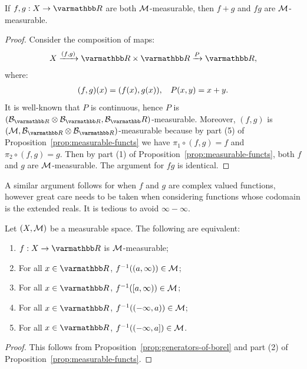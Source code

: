 \begin{proposition}\label{prop:sums-prods-of-measurable-functions}
    If $f,g:X \rightarrow \bfR$ are both $\cM$-measurable, then $f+g$ and $fg$ are $\cM$-measurable.
\end{proposition}
    \begin{proof}
        Consider the composition of maps:
            \begin{equation*}
            \begin{split}
                X \xrightarrow{(f,g)} \bfR \times \bfR \xrightarrow{P} \bfR,
            \end{split}
            \end{equation*}
        where:
            \begin{equation*}
            \begin{split}
                (f,g)(x) = (f(x),g(x)), \h9 P(x,y) = x + y.
            \end{split}
            \end{equation*}
        It is well-known that $P$ is continuous, hence $P$ is $(\cB_{\bfR}\otimes\cB_{\bfR},\cB_\bfR)$-measurable. Moreover, $(f,g)$ is $(\cM,\cB_{\bfR}\otimes\cB_{\bfR})$-measurable because \textemdash by part (5) of Proposition~\ref{prop:measurable-functs} \textemdash we have $\pi_1 \circ (f,g) = f$ and $\pi_2 \circ (f,g) = g$. Then by part (1) of Proposition~\ref{prop:measurable-functs}, both $f$ and $g$ are $\cM$-measurable. The argument for $fg$ is identical.
    \end{proof}

A similar argument follows for when $f$ and $g$ are complex valued functions, however great care needs to be taken when considering functions whose codomain is the extended reals. It is tedious to avoid $\infty-\infty$.

\begin{proposition}
    Let $(X,\cM)$ be a measurable space. The following are equivalent:
        \begin{enumerate}[label = (\arabic*),itemsep=1pt,topsep=3pt]
            \item $f:X \rightarrow \bfR$ is $\cM$-measurable;
            \item For all $x \in \bfR$, $f^{-1}((a,\infty)) \in \cM$;
            \item For all $x \in \bfR$, $f^{-1}([a,\infty)) \in \cM$;
            \item For all $x \in \bfR$, $f^{-1}((-\infty,a)) \in \cM$;
            \item For all $x \in \bfR$, $f^{-1}((-\infty,a]) \in \cM$.
        \end{enumerate}
\end{proposition}
    \begin{proof}
        This follows from Proposition~\ref{prop:generators-of-borel} and part (2) of Proposition~\ref{prop:measurable-functs}.
    \end{proof}

